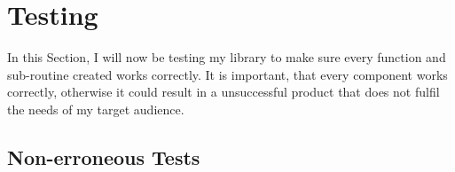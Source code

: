 \chapter{Testing}
In this Section, I will now be testing my library to make sure every function and sub-routine created works correctly. It is important, that every component works correctly, otherwise it could result in a unsuccessful product that does not fulfil the needs of my target audience.
\section{Non-erroneous Tests}





